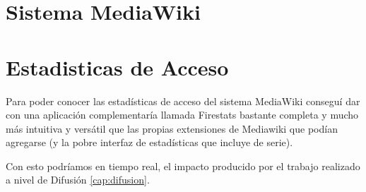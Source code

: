 
\section{Sistema MediaWiki}



\section{Estadisticas de Acceso}

Para poder conocer las estadísticas de acceso del sistema MediaWiki conseguí dar con una aplicación complementaría llamada Firestats \cite{website:firestats} bastante completa y mucho más intuitiva y versátil que las propias extensiones de Mediawiki que podían agregarse (y la pobre interfaz de estadísticas que incluye de serie).

Con esto podríamos en tiempo real, el impacto producido por el trabajo realizado a nivel de Difusión \ref{cap:difusion}.
